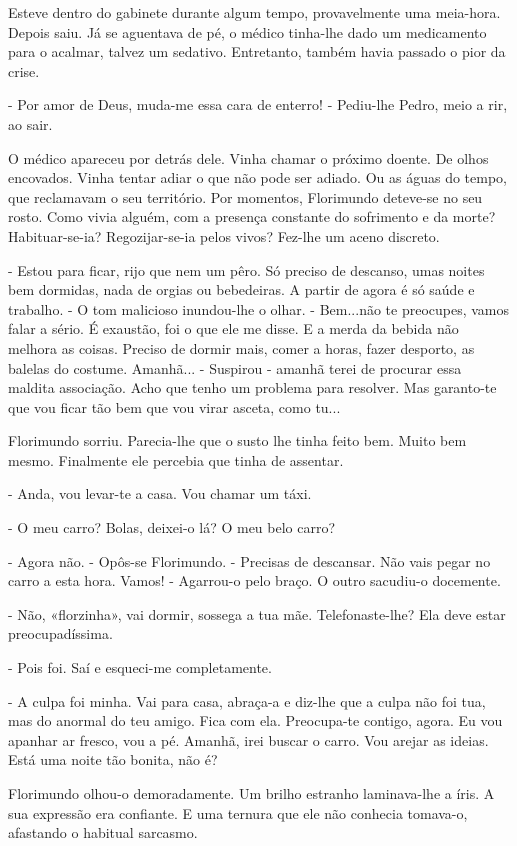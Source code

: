Esteve dentro do gabinete durante algum tempo, provavelmente uma
meia-hora. Depois saiu. Já se aguentava de pé, o médico tinha-lhe dado
um medicamento para o acalmar, talvez um sedativo. Entretanto, também
havia passado o pior da crise.

- Por amor de Deus, muda-me essa cara de enterro! - Pediu-lhe Pedro,
meio a rir, ao sair.

O médico apareceu por detrás dele. Vinha chamar o próximo doente. De
olhos encovados. Vinha tentar adiar o que não pode ser adiado. Ou as
águas do tempo, que reclamavam o seu território. Por momentos,
Florimundo deteve-se no seu rosto. Como vivia alguém, com a presença
constante do sofrimento e da morte? Habituar-se-ia? Regozijar-se-ia
pelos vivos? Fez-lhe um aceno discreto.

- Estou para ficar, rijo que nem um pêro. Só preciso de descanso, umas
noites bem dormidas, nada de orgias ou bebedeiras. A partir de agora é
só saúde e trabalho. - O tom malicioso inundou-lhe o olhar. - Bem...não
te preocupes, vamos falar a sério. É exaustão, foi o que ele me disse. E
a merda da bebida não melhora as coisas. Preciso de dormir mais, comer a
horas, fazer desporto, as balelas do costume. Amanhã... - Suspirou -
amanhã terei de procurar essa maldita associação. Acho que tenho um
problema para resolver. Mas garanto-te que vou ficar tão bem que vou
virar asceta, como tu...

Florimundo sorriu. Parecia-lhe que o susto lhe tinha feito bem. Muito
bem mesmo. Finalmente ele percebia que tinha de assentar.

- Anda, vou levar-te a casa. Vou chamar um táxi.

- O meu carro? Bolas, deixei-o lá? O meu belo carro?

- Agora não. - Opôs-se Florimundo. - Precisas de descansar. Não vais
pegar no carro a esta hora. Vamos! - Agarrou-o pelo braço. O outro
sacudiu-o docemente.

- Não, «florzinha», vai dormir, sossega a tua mãe. Telefonaste-lhe? Ela
deve estar preocupadíssima.

- Pois foi. Saí e esqueci-me completamente.

- A culpa foi minha. Vai para casa, abraça-a e diz-lhe que a culpa não
foi tua, mas do anormal do teu amigo. Fica com ela. Preocupa-te contigo,
agora. Eu vou apanhar ar fresco, vou a pé. Amanhã, irei buscar o carro.
Vou arejar as ideias. Está uma noite tão bonita, não é?

Florimundo olhou-o demoradamente. Um brilho estranho laminava-lhe a
íris. A sua expressão era confiante. E uma ternura que ele não conhecia
tomava-o, afastando o habitual sarcasmo.

